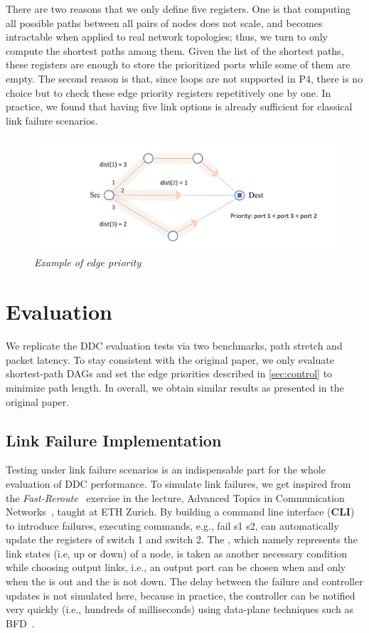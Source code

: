 There are two reasons that we only define five registers. One is that computing all possible paths between all pairs of nodes does not scale, and becomes intractable when applied to real network topologies; thus, we turn to only compute the shortest paths among them. Given the list of the shortest paths, these registers are enough to store the prioritized ports while some of them are empty. 
The second reason is that, since loops are not supported in P4, there is no choice but to check these edge priority registers repetitively one by one. In practice, we found that having five link options is already sufficient for classical link failure scenarios. 

\begin{figure}[H]
      \centering \includegraphics[scale=0.40]{pictures/edge prios.png}
      \caption{\it{Example of edge priority}}
      \label{fig:edge prios}
\end{figure}


\section{Evaluation}
We replicate the DDC evaluation tests via two benchmarks, path stretch and packet latency. To stay consistent with the original paper, we only evaluate shortest-path DAGs and set the edge priorities described in \cref{sec:control} to minimize path length. 
In overall, we obtain similar results as presented in the original paper. 

\subsection{Link Failure Implementation}
Testing under link failure scenarios is an indispensable part for the whole evaluation of DDC performance. To simulate link failures, we get inspired from the \textit{Fast-Reroute}~\cite{12-Fast-Reroute} exercise in the lecture, Advanced Topics in Communication Networks~\cite{adv-net}, taught at ETH Zurich. By building a command line interface (\textbf{CLI}) to introduce failures, executing commands, e.g., fail s1 s2, can automatically update the \lkst registers of switch 1 and switch 2. The \lkst, which namely represents the link states (i.e, up or down) of a node, is taken as another necessary condition while choosing output links, i.e., an output port can be chosen when and only when the \ld is out and the \lkst is not down. The delay between the failure and controller updates is not simulated here, because in practice, the controller can be notified very quickly (i.e., hundreds of milliseconds) using data-plane techniques such as BFD~\cite{rfc5880}. 

